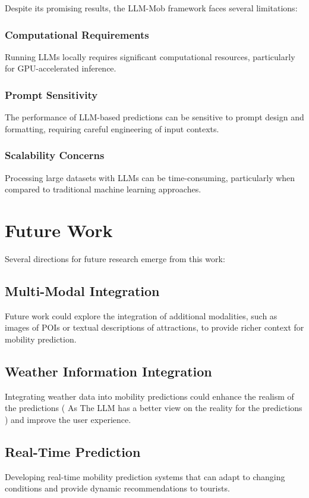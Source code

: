 \documentclass[12pt,a4paper]{article}
\begin{document}
Despite its promising results, the LLM-Mob framework faces several limitations:

\subsubsection{Computational Requirements}
Running LLMs locally requires significant computational resources, particularly for GPU-accelerated inference.

\subsubsection{Prompt Sensitivity}
The performance of LLM-based predictions can be sensitive to prompt design and formatting, requiring careful engineering of input contexts.

\subsubsection{Scalability Concerns}
Processing large datasets with LLMs can be time-consuming, particularly when compared to traditional machine learning approaches.

\section{Future Work}

Several directions for future research emerge from this work:

\subsection{Multi-Modal Integration}
Future work could explore the integration of additional modalities, such as images of POIs or textual descriptions of attractions, to provide richer context for mobility prediction.

\subsection{Weather Information Integration}
Integrating weather data into mobility predictions could enhance the realism of the predictions ( As The LLM has a better view on the reality for the predictions ) and improve the user experience. 

\subsection{Real-Time Prediction}
Developing real-time mobility prediction systems that can adapt to changing conditions and provide dynamic recommendations to tourists.
\end{document}
